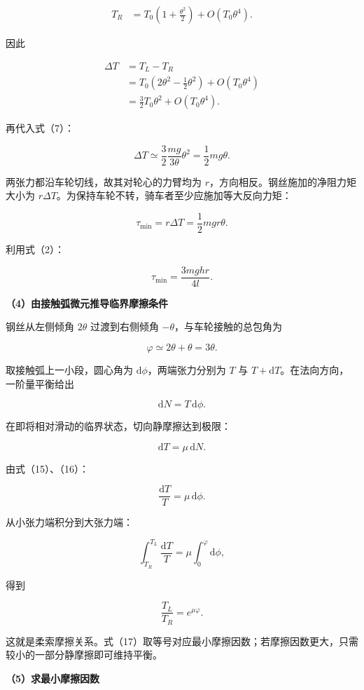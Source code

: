 \documentclass[12pt,a4paper,UTF8]{ctexart}
\begin{document}
\[
\begin{aligned}
T_R
&=T_0\left(1+\frac{\theta^2}{2}\right)+O(T_0\theta^4).
\end{aligned}
\tag{10}
\]

因此

\[
\begin{aligned}
\Delta T
&=T_L-T_R\\
&=T_0\left(2\theta^2-\frac12\theta^2\right)+O(T_0\theta^4)\\
&=\frac32T_0\theta^2+O(T_0\theta^4).
\end{aligned}
\tag{11}
\]

再代入式（7）：

\[
\Delta T
\simeq\frac32\frac{mg}{3\theta}\theta^2
=\frac12mg\theta.
\tag{12}
\]

两张力都沿车轮切线，故其对轮心的力臂均为
\(r\)，方向相反。钢丝施加的净阻力矩大小为
\(r\Delta T\)。为保持车轮不转，骑车者至少应施加等大反向力矩：

\[
\tau_{\min}=r\Delta T
=\frac12mgr\theta.
\]

利用式（2）：

\[
\boxed{
\tau_{\min}
=\frac{3mghr}{4l}
}.
\tag{13}
\]

\textbf{（4）由接触弧微元推导临界摩擦条件}

钢丝从左侧倾角 \(2\theta\) 过渡到右侧倾角
\(-\theta\)，与车轮接触的总包角为

\[
\varphi\simeq2\theta+\theta=3\theta.
\tag{14}
\]

取接触弧上一小段，圆心角为 \(\mathrm d\phi\)，两端张力分别为 \(T\) 与
\(T+\mathrm dT\)。在法向方向，一阶量平衡给出

\[
\mathrm dN=T\,\mathrm d\phi.
\tag{15}
\]

在即将相对滑动的临界状态，切向静摩擦达到极限：

\[
\mathrm dT=\mu\,\mathrm dN.
\tag{16}
\]

由式（15）、（16）：

\[
\frac{\mathrm dT}{T}=\mu\,\mathrm d\phi.
\]

从小张力端积分到大张力端：

\[
\int_{T_R}^{T_L}\frac{\mathrm dT}{T}
=\mu\int_0^{\varphi}\mathrm d\phi,
\]

得到

\[
\boxed{\frac{T_L}{T_R}=e^{\mu\varphi}}.
\tag{17}
\]

这就是柔索摩擦关系。式（17）取等号对应最小摩擦因数；若摩擦因数更大，只需较小的一部分静摩擦即可维持平衡。

\textbf{（5）求最小摩擦因数}
\end{document}
